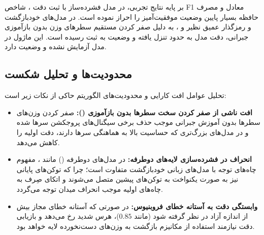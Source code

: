 بر پایه نتایج تجربی، در مدل  فشرده‌ساز  با ثبت دقت ، شاخص F1 معادل  و مصرف حافظه بسیار پایین  وضعیت موفقیت‌آمیز  را احراز نموده است. در مدل‌های خودبازگشت و رمزگذار عمیق نظیر  و ، به دلیل صفر کردن مستقیم سطرهای وزن بدون بازآموزی جبرانی، دقت مدل به حدود  تنزل یافته و وضعیت  به ثبت رسیده است. این ماژول در مدل  آزمایش نشده و وضعیت  دارد.

\subsection{محدودیت‌ها و تحلیل شکست}
تحلیل عوامل افت کارایی و محدودیت‌های الگوریتم حاکی از نکات زیر است:
\begin{itemize}
    \item \textbf{افت ناشی از صفر کردن سخت سطرها بدون بازآموزی ():} صفر کردن وزن‌های سطرها بدون آموزش جبرانی موجب حذف برخی سیگنال‌های پروجکشن سرها شده و در مدل‌های بزرگ‌تری که حساسیت بالا به هماهنگی سرها دارند، دقت اولیه را کاهش می‌دهد.
    \item \textbf{انحراف در فشرده‌سازی لایه‌های دوطرفه:} در مدل‌های دوطرفه () مانند ، مفهوم چاه‌های توجه با مدل‌های زبانی خودبازگشت متفاوت است؛ چرا که توکن‌های پایانی نیز به صورت یکنواخت به توکن‌های پیشین متصل می‌شوند و اتکای صِرف به چاه‌های اولیه موجب انحراف میدان توجه می‌گردد.
    \item \textbf{وابستگی دقت به آستانه خطای فروبنیوس:} در صورتی که آستانه خطای مجاز بیش از اندازه آزاد در نظر گرفته شود (مانند $0.85$)، هرس شدید رخ می‌دهد و بازیابی دقت نیازمند استفاده از مکانیزم بازگشت به وزن‌های دست‌نخورده لایه خواهد بود.
\end{itemize}
